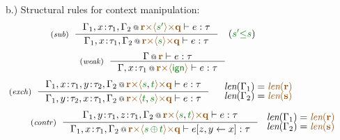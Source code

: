 \begin{figure}[t]
\vspace{1em}
{\small b.) Structural rules for context manipulation:}
\begin{equation*}
\tyrule{sub}
  {\coctx{\Gamma_1,x\!:\!\tau_1,\Gamma_2}{\aclrd{\textbf{r}} \atimes \alift{\cclrd{s'}} \atimes \aclrd{\textbf{q}}} \vdash e : \tau}
  {\coctx{\Gamma_1,x\!:\!\tau_1,\Gamma_2}{\aclrd{\textbf{r}} \atimes \alift{\cclrd{s}} \atimes \aclrd{\textbf{q}}} \vdash e : \tau}
\quad
(\cclrd{s'} \cleq \cclrd{s})
\end{equation*}
\begin{equation*}
\tyrule{weak}
  {\coctx{\Gamma}{ \aclrd{\textbf{r}} } \vdash e : \tau}
  {\coctx{\Gamma,x \!:\! \tau_1}{\aclrd{\textbf{r}} \atimes \alift{ \czero }} \vdash e : \tau} 
\end{equation*}
\begin{equation*}
\tyrule{exch}
  {\coctx{\Gamma_1,x\!:\!\tau_1,y\!:\!\tau_2,\Gamma_2}{\aclrd{\textbf{r}} \atimes \alift{\cclrd{s},\cclrd{t}} \atimes \aclrd{\textbf{q}}} \vdash e : \tau}
  {\coctx{\Gamma_1,y\!:\!\tau_2,x\!:\!\tau_1,\Gamma_2}{\aclrd{\textbf{r}} \atimes \alift{\cclrd{t},\cclrd{s}} \atimes \aclrd{\textbf{q}}} \vdash e : \tau}
\quad
\begin{array}{l}
 \xlen{\Gamma_1} = \alen{\aclrd{\textbf{r}}}\\[-0.25em]
 \xlen{\Gamma_2} = \alen{\aclrd{\textbf{s}}}
\end{array}
\end{equation*}
\begin{equation*}
\hspace{2.5em} 
\tyrule{contr}
  {\coctx{\Gamma_1,y\!:\!\tau_1,z\!:\!\tau_1,\Gamma_2}{\aclrd{\textbf{r}} \atimes \alift{\cclrd{s},\cclrd{t}} \atimes \aclrd{\textbf{q}}} \vdash e : \tau}
  {\coctx{\Gamma_1,x\!:\!\tau_1,\Gamma_2}{\aclrd{\textbf{r}} \atimes \alift{\cclrd{s} \,\cpar\, \cclrd{t}} \atimes \aclrd{\textbf{q}}} \vdash \subst{e}{z,y}{x} : \tau}
~
\begin{array}{l}
 \xlen{\Gamma_1} = \alen{\aclrd{\textbf{r}}}\\[-0.25em]
 \xlen{\Gamma_2} = \alen{\aclrd{\textbf{s}}}
\end{array}
\end{equation*}

\label{fig:struct-types}
\end{figure}


